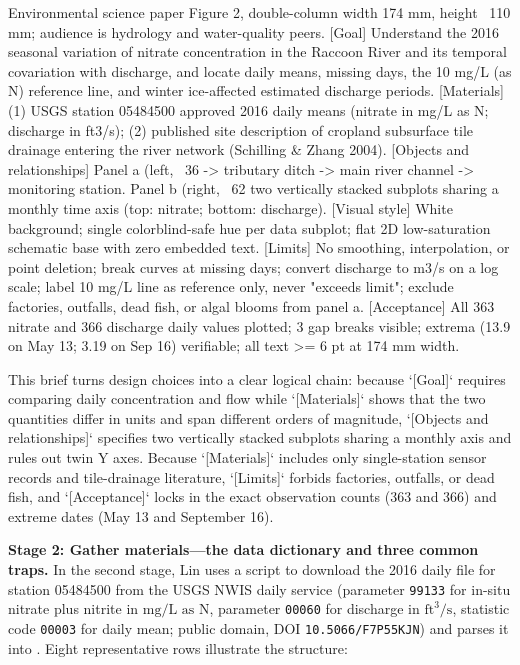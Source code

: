 \begin{Prompt}
 Environmental science paper Figure 2, double-column width 174 mm,
height ~110 mm; audience is hydrology and water-quality peers.
[Goal] Understand the 2016 seasonal variation of nitrate concentration in the Raccoon
River and its temporal covariation with discharge, and locate daily means, missing days,
the 10 mg/L (as N) reference line, and winter ice-affected estimated discharge periods.
[Materials] (1) USGS station 05484500 approved 2016 daily means (nitrate in mg/L as N;
discharge in ft3/s); (2) published site description of cropland subsurface tile drainage
entering the river network (Schilling & Zhang 2004).
[Objects and relationships] Panel a (left, ~36%
-> tributary ditch -> main river channel -> monitoring station. Panel b (right, ~62%
two vertically stacked subplots sharing a monthly time axis (top: nitrate; bottom: discharge).
[Visual style] White background; single colorblind-safe hue per data subplot; flat 2D
low-saturation schematic base with zero embedded text.
[Limits] No smoothing, interpolation, or point deletion; break curves at missing days;
convert discharge to m3/s on a log scale; label 10 mg/L line as reference only, never
"exceeds limit"; exclude factories, outfalls, dead fish, or algal blooms from panel a.
[Acceptance] All 363 nitrate and 366 discharge daily values plotted; 3 gap breaks visible;
extrema (13.9 on May 13; 3.19 on Sep 16) verifiable; all text >= 6 pt at 174 mm width.
\end{Prompt}

This brief turns design choices into a clear logical chain: because `[Goal]` requires comparing daily concentration and flow while `[Materials]` shows that the two quantities differ in units and span different orders of magnitude, `[Objects and relationships]` specifies two vertically stacked subplots sharing a monthly axis and rules out twin Y axes. Because `[Materials]` includes only single-station sensor records and tile-drainage literature, `[Limits]` forbids factories, outfalls, or dead fish, and `[Acceptance]` locks in the exact observation counts (363 and 366) and extreme dates (May 13 and September 16).

\textbf{Stage 2: Gather materials---the data dictionary and three common traps.} In the second stage, Lin uses a script to download the 2016 daily file for station 05484500 from the USGS NWIS daily service (parameter \texttt{99133} for in-situ nitrate plus nitrite in $\text{mg/L as N}$, parameter \texttt{00060} for discharge in $\text{ft}^3/\text{s}$, statistic code \texttt{00003} for daily mean; public domain, DOI \texttt{10.5066/F7P55KJN}) and parses it into . Eight representative rows illustrate the structure:

